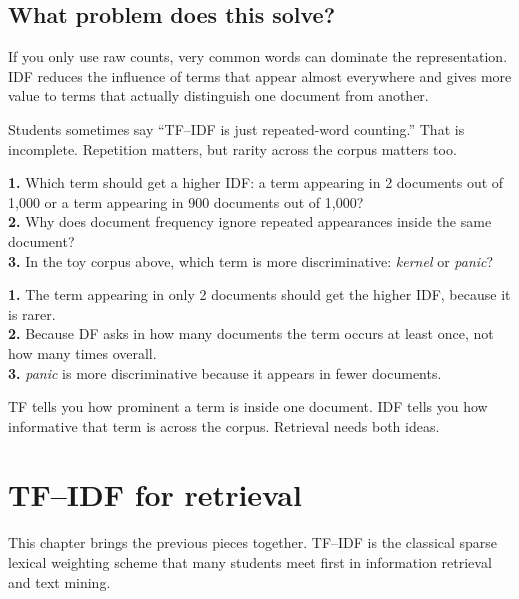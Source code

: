 \documentclass[11pt,oneside]{report}
\begin{document}
\section*{What problem does this solve?}
If you only use raw counts, very common words can dominate the representation. IDF reduces the influence of terms that appear almost everywhere and gives more value to terms that actually distinguish one document from another.

\begin{warningbox}
Students sometimes say ``TF--IDF is just repeated-word counting.'' That is incomplete. Repetition matters, but rarity across the corpus matters too.
\end{warningbox}

\begin{selfcheckbox}
\textbf{1.} Which term should get a higher IDF: a term appearing in 2 documents out of 1{,}000 or a term appearing in 900 documents out of 1{,}000?\\
\textbf{2.} Why does document frequency ignore repeated appearances inside the same document?\\
\textbf{3.} In the toy corpus above, which term is more discriminative: \emph{kernel} or \emph{panic}?
\end{selfcheckbox}

\begin{answerbox}
\textbf{1.} The term appearing in only 2 documents should get the higher IDF, because it is rarer.\\
\textbf{2.} Because DF asks in how many documents the term occurs at least once, not how many times overall.\\
\textbf{3.} \emph{panic} is more discriminative because it appears in fewer documents.
\end{answerbox}

\begin{rememberbox}
TF tells you how prominent a term is inside one document. IDF tells you how informative that term is across the corpus. Retrieval needs both ideas.
\end{rememberbox}


\chapter[TF--IDF Retrieval]{TF--IDF for retrieval}

\begin{purposebox}
This chapter brings the previous pieces together. TF--IDF is the classical sparse lexical weighting scheme that many students meet first in information retrieval and text mining.
\end{purposebox}
\end{document}
